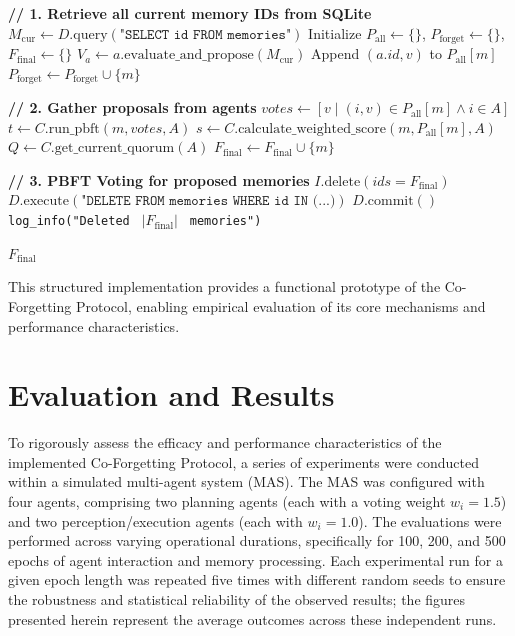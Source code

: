\documentclass[conference]{IEEEtran}
\begin{document}
\begin{algorithm}[H]
\caption{Memory Forgetting with PBFT Consensus}
\label{alg:epoch_sync_coordinator}
\begin{algorithmic}[1]
\State \textbf{// 1. Retrieve all current memory IDs from SQLite}
\State $M_{\text{cur}} \gets D.\text{query}(\texttt{"SELECT id FROM memories"})$
\State Initialize $P_{\text{all}} \gets \{\}$, $P_{\text{forget}} \gets \{\}$, $F_{\text{final}} \gets \{\}$
    \State $V_a \gets a.\text{evaluate\_and\_propose}(M_{\text{cur}})$
        \State Append $(a.id, v)$ to $P_{\text{all}}[m]$
            \State $P_{\text{forget}} \gets P_{\text{forget}} \cup \{m\}$
        \EndIf
    \EndFor
\EndFor

\State \textbf{// 2. Gather proposals from agents}
    \State $votes \gets [v \mid (i,v) \in P_{\text{all}}[m] \land i \in A]$
    \State $t \gets C.\text{run\_pbft}(m, votes, A)$
        \State $s \gets C.\text{calculate\_weighted\_score}(m, P_{\text{all}}[m], A)$
        \State $Q \gets C.\text{get\_current\_quorum}(A)$
            \State $F_{\text{final}} \gets F_{\text{final}} \cup \{m\}$
        \EndIf
    \EndIf
\EndFor

\State \textbf{// 3. PBFT Voting for proposed memories}
    \State $I.\text{delete}(ids = F_{\text{final}})$
    \State $D.\text{execute}(\texttt{"DELETE FROM memories WHERE id IN (...)})$
    \State $D.\text{commit}()$
    \State \texttt{log\_info("Deleted } $\left| F_{\text{final}} \right|$ \texttt{ memories")}
\EndIf

\State \Return $F_{\text{final}}$
\end{algorithmic}
\end{algorithm}


This structured implementation provides a functional prototype of the Co-Forgetting Protocol, enabling empirical evaluation of its core mechanisms and performance characteristics.

\section{Evaluation and Results}
\label{sec:evaluation}

To rigorously assess the efficacy and performance characteristics of the implemented Co-Forgetting Protocol, a series of experiments were conducted within a simulated multi-agent system (MAS). The MAS was configured with four agents, comprising two planning agents (each with a voting weight $w_i = 1.5$) and two perception/execution agents (each with $w_i = 1.0$). The evaluations were performed across varying operational durations, specifically for 100, 200, and 500 epochs of agent interaction and memory processing. Each experimental run for a given epoch length was repeated five times with different random seeds to ensure the robustness and statistical reliability of the observed results; the figures presented herein represent the average outcomes across these independent runs.
\end{document}
